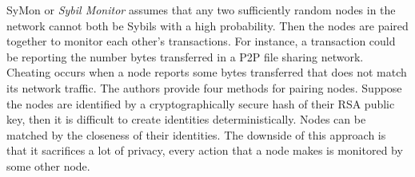 SyMon\cite{jyothi2009symon} or \emph{Sybil Monitor} assumes that any two
sufficiently random nodes in the network cannot both be Sybils with a high
probability. Then the nodes are paired together to monitor each other's
transactions. For instance, a transaction could be reporting the number bytes
transferred in a P2P file sharing network. Cheating occurs when a node reports
some bytes transferred that does not match its network traffic. The authors
provide four methods for pairing nodes. Suppose the nodes are identified by a
cryptographically secure hash of their RSA public key, then it is difficult to
create identities deterministically. Nodes can be matched by the closeness of
their identities. The downside of this approach is that it sacrifices a lot of
privacy, every action that a node makes is monitored by some other node.



